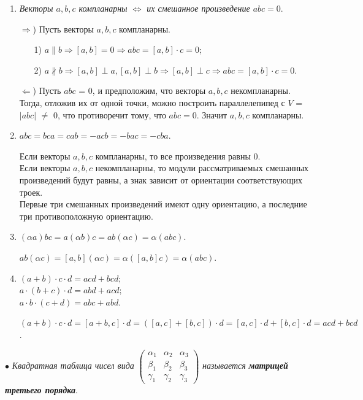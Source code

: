 \begin{enumerate}
	\item \textit{Векторы $a, b, c$ компланарны $\Longleftrightarrow$ их смешанное произведение $abc = 0$}.
	\begin{Proof}
		$\Rightarrow$) Пусть векторы $a, b, c$ компланарны.
		\begin{enumerate}
			\item [1)] $a \parallel b \Rightarrow [a, b] = 0 \Rightarrow abc = [a, b]\cdot c = 0$; 
			\item [2)] $a \nparallel b \Rightarrow [a, b] \perp a, [a, b] \perp b \Rightarrow [a, b] \perp c \Rightarrow abc = [a, b]\cdot c = 0$. 
		\end{enumerate}
		$\Leftarrow$) Пусть $abc$ = 0, и предположим, что векторы $a, b, c$ некомпланарны. Тогда, отложив их от одной точки, можно построить параллелепипед с $V$ = $|abc|$ $\not=$ 0, что противоречит тому, что $abc = 0$. Значит $a, b, c$ компланарны.
	\end{Proof}
	\item $abc = bca = cab = -acb = -bac = -cba$.
	\begin{Proof}
		Если векторы $a, b, c$ компланарны, то все произведения равны 0. \\
		Если векторы $a, b, c$ некомпланарны, то модули рассматриваемых смешанных произведений будут равны, а знак зависит от ориентации соответствующих троек. \\
		Первые три смешанных произведений имеют одну ориентацию, а последние три противоположную ориентацию.
	\end{Proof}
	\item $(\alpha a) bc = a (\alpha b) c = ab (\alpha c) = \alpha (abc)$.
	\begin{Proof}
		$ab(\alpha c) = [a, b] (\alpha c) = \alpha ([a, b] c) = \alpha (abc)$.
	\end{Proof}
	\item $(a + b) \cdot c \cdot d = acd + bcd;$ \\
	$a \cdot (b + c) \cdot d = abd + acd;$ \\
	$a \cdot b \cdot (c + d) = abc + abd.$
	\begin{Proof}
		$(a + b) \cdot c \cdot d = [a + b, c] \cdot d = ([a, c] + [b, c]) \cdot d = [a, c] \cdot d + [b, c] \cdot d = acd + bcd$.
	\end{Proof}
\end{enumerate}
$\bullet$ \textit{Квадратная таблица чисел вида} $\begin{pmatrix} \alpha_1 & \alpha_2 & \alpha_3 \\ 
	\beta_1 & \beta_2 & \beta_3 \\ \gamma_1 & \gamma_2 & \gamma_3 \end{pmatrix}$ \textit{называется \textbf{матрицей третьего порядка}}.\\
